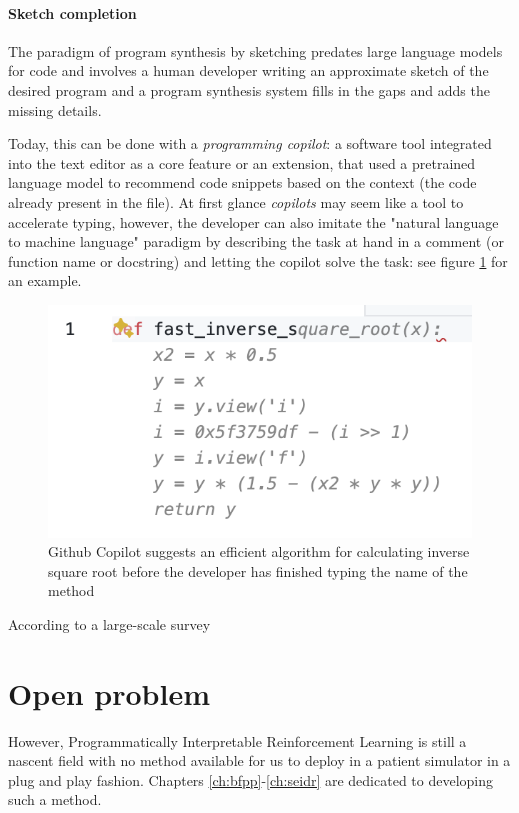 
\paragraph{Sketch completion}

The paradigm of program synthesis by sketching predates large language models for code \cite{solar-lezamaProgramSynthesisSketching2008} and involves a human developer writing an approximate sketch of the desired program and a program synthesis system fills in the gaps and adds the missing details.

Today, this can be done with a \emph{programming copilot}: a software tool integrated into the text editor as a core feature or an extension, that used a pretrained language model to recommend code snippets based on the context (the code already present in the file).
At first glance \emph{copilots} may seem like a tool to accelerate typing, however, the developer can also imitate the "natural language to machine language" paradigm by describing the task at hand in a comment (or function name or docstring) and letting the copilot solve the task: see figure \ref{fig:fastinversesqrt} for an example.

\begin{figure}
    \centering
    \includegraphics{images/fastinversesqrt.png}
    \caption{Github Copilot \cite{dakhelGithubCopilotAi2023, nguyenEmpiricalEvaluationGitHub2022, wermelingerUsingGithubCopilot2023} suggests an efficient algorithm for calculating inverse square root \cite{lomontFastInverseSquare2003} before the developer has finished typing the name of the method}
    \label{fig:fastinversesqrt}
\end{figure}

According to a large-scale survey \cite{liangLargeScaleSurveyUsability2024} 

\newpage
\section{Open problem}
\label{sec:goal}

However, Programmatically Interpretable Reinforcement Learning is still a nascent field with no method available for us to deploy in a patient simulator in a plug and play fashion.
Chapters \ref{ch:bfpp}-\ref{ch:seidr} are dedicated to developing such a method.